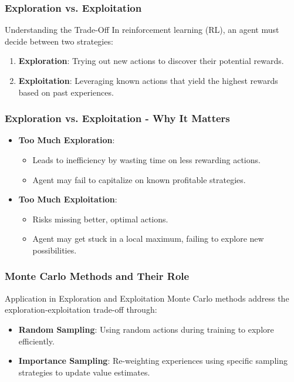 \documentclass[aspectratio=169]{beamer}
\begin{document}
\begin{frame}[fragile]
    \frametitle{Exploration vs. Exploitation}
    \begin{block}{Understanding the Trade-Off}
        In reinforcement learning (RL), an agent must decide between two strategies:
        \begin{enumerate}
            \item \textbf{Exploration}: Trying out new actions to discover their potential rewards.
            \item \textbf{Exploitation}: Leveraging known actions that yield the highest rewards based on past experiences.
        \end{enumerate}
    \end{block}
\end{frame}

\begin{frame}[fragile]
    \frametitle{Exploration vs. Exploitation - Why It Matters}
    \begin{itemize}
        \item \textbf{Too Much Exploration}:
            \begin{itemize}
                \item Leads to inefficiency by wasting time on less rewarding actions.
                \item Agent may fail to capitalize on known profitable strategies.
            \end{itemize}
        \item \textbf{Too Much Exploitation}:
            \begin{itemize}
                \item Risks missing better, optimal actions.
                \item Agent may get stuck in a local maximum, failing to explore new possibilities.
            \end{itemize}
    \end{itemize}
\end{frame}

\begin{frame}[fragile]
    \frametitle{Monte Carlo Methods and Their Role}
    \begin{block}{Application in Exploration and Exploitation}
        Monte Carlo methods address the exploration-exploitation trade-off through:
        \begin{itemize}
            \item \textbf{Random Sampling}: Using random actions during training to explore efficiently.
            \item \textbf{Importance Sampling}: Re-weighting experiences using specific sampling strategies to update value estimates.
        \end{itemize}
    \end{block}
\end{frame}
\end{document}
